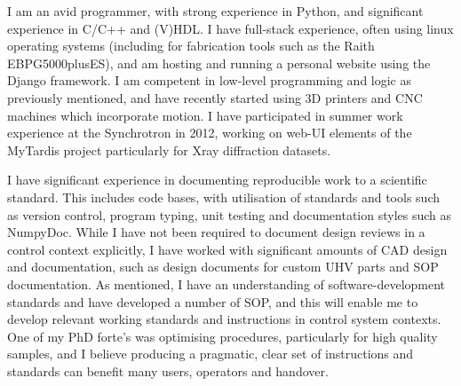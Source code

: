 \documentclass[10pt,a4paper,ragged2e,withhyper,paragraphstrue]{altacv}
\newcommand{\pind}{\hspace{24pt}}
\begin{document}
{    %
    \pind I am an avid programmer, with strong experience in Python, and significant experience in C/C++ and (V)HDL. I have full-stack experience, often using linux
    operating systems (including for fabrication tools such as the Raith EBPG5000plusES), and am hosting and running a personal website using the Django framework. 
    I am competent in low-level programming and logic as previously mentioned, and have recently started using 3D printers and CNC machines which incorporate motion.
    I have participated in summer work experience at the Synchrotron in 2012, working on web-UI elements of the MyTardis project particularly for Xray diffraction datasets.

    \pind I have significant experience in documenting reproducible work to a scientific standard. This includes code bases, with utilisation of standards and tools such as
    version control, program typing, unit testing and documentation styles such as NumpyDoc. While I have not been required to document design reviews in a control context 
    explicitly, I have worked with significant amounts of CAD design and documentation, such as design documents for custom UHV parts and SOP documentation.
    As mentioned, I have an understanding of software-development standards and have developed a number of SOP, and this will enable me to develop relevant
    working standards and instructions in control system contexts. One of my PhD forte's was optimising procedures, particularly for high quality samples, and I believe 
    producing a pragmatic, clear set of instructions and standards can benefit many users, operators and handover.

}
\end{document}
